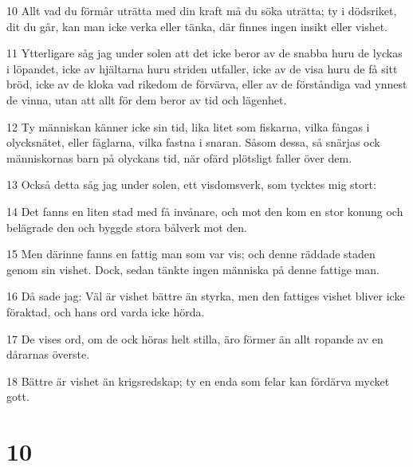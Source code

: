 \par 10 Allt vad du förmår uträtta med din kraft må du söka uträtta; ty i dödsriket, dit du går, kan man icke verka eller tänka, där finnes ingen insikt eller vishet.
\par 11 Ytterligare såg jag under solen att det icke beror av de snabba huru de lyckas i löpandet, icke av hjältarna huru striden utfaller, icke av de visa huru de få sitt bröd, icke av de kloka vad rikedom de förvärva, eller av de förståndiga vad ynnest de vinna, utan att allt för dem beror av tid och lägenhet.
\par 12 Ty människan känner icke sin tid, lika litet som fiskarna, vilka fångas i olycksnätet, eller fåglarna, vilka fastna i snaran. Såsom dessa, så snärjas ock människornas barn på olyckans tid, när ofärd plötsligt faller över dem.
\par 13 Också detta såg jag under solen, ett visdomsverk, som tycktes mig stort:
\par 14 Det fanns en liten stad med få invånare, och mot den kom en stor konung och belägrade den och byggde stora bålverk mot den.
\par 15 Men därinne fanns en fattig man som var vis; och denne räddade staden genom sin vishet. Dock, sedan tänkte ingen människa på denne fattige man.
\par 16 Då sade jag: Väl är vishet bättre än styrka, men den fattiges vishet bliver icke föraktad, och hans ord varda icke hörda.
\par 17 De vises ord, om de ock höras helt stilla, äro förmer än allt ropande av en dårarnas överste.
\par 18 Bättre är vishet än krigsredskap; ty en enda som felar kan fördärva mycket gott.

\chapter{10}

